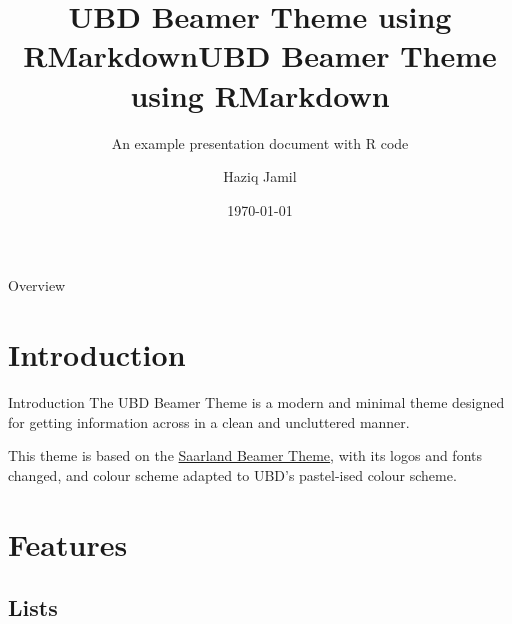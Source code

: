 \documentclass[,aspectratio=43]{beamer}
\author{Haziq Jamil}
\title{UBD Beamer Theme using RMarkdown}
\title{UBD Beamer Theme using RMarkdown}
\subtitle{An example presentation document with R code}
\institute{Mathematical Sciences, Faculty of Science, UBD\\
\url{https://haziqj.ml}}
\date{\today}
\begin{document}
\begin{frame}
	\titlepage
\end{frame}

\begin{frame}{Overview}
    \tableofcontents
  \end{frame}
\hypertarget{introduction}{%
\section{Introduction}\label{introduction}}

\begin{frame}{Introduction}
The UBD Beamer Theme is a modern and minimal theme designed for getting
information across in a clean and uncluttered manner.

This theme is based on the
\href{https://github.com/kailashbuki/beamerthemesaarland}{Saarland
Beamer Theme}, with its logos and fonts changed, and colour scheme
adapted to UBD's pastel-ised colour scheme.
\end{frame}

\hypertarget{features}{%
\section{Features}\label{features}}

\hypertarget{lists}{%
\subsection{Lists}\label{lists}}
\end{document}
